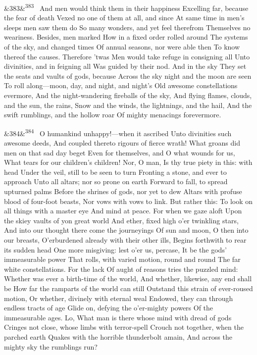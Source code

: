 \documentclass[12pt]{article}
\newcommand{\para}[1][]{\par\noindent\ifx&#1&\else\textsuperscript{\footnotesize #1}~\fi}
\begin{document}
\para[383] And men would think them in their happiness Excelling far, because the fear of death Vexed no one of them at all, and since At same time in men's sleeps men saw them do So many wonders, and yet feel therefrom Themselves no weariness. Besides, men marked How in a fixed order rolled around The systems of the sky, and changed times Of annual seasons, nor were able then To know thereof the causes. Therefore 'twas Men would take refuge in consigning all Unto divinities, and in feigning all Was guided by their nod. And in the sky They set the seats and vaults of gods, because Across the sky night and the moon are seen To roll along---moon, day, and night, and night's Old awesome constellations evermore, And the night-wandering fireballs of the sky, And flying flames, clouds, and the sun, the rains, Snow and the winds, the lightnings, and the hail, And the swift rumblings, and the hollow roar Of mighty menacings forevermore.

\para[384] O humankind unhappy!---when it ascribed Unto divinities such awesome deeds, And coupled thereto rigours of fierce wrath! What groans did men on that sad day beget Even for themselves, and O what wounds for us, What tears for our children's children! Nor, O man, Is thy true piety in this: with head Under the veil, still to be seen to turn Fronting a stone, and ever to approach Unto all altars; nor so prone on earth Forward to fall, to spread upturned palms Before the shrines of gods, nor yet to dew Altars with profuse blood of four-foot beasts, Nor vows with vows to link. But rather this: To look on all things with a master eye And mind at peace. For when we gaze aloft Upon the skiey vaults of yon great world And ether, fixed high o'er twinkling stars, And into our thought there come the journeyings Of sun and moon, O then into our breasts, O'erburdened already with their other ills, Begins forthwith to rear its sudden head One more misgiving: lest o'er us, percase, It be the gods' immeasurable power That rolls, with varied motion, round and round The far white constellations. For the lack Of aught of reasons tries the puzzled mind: Whether was ever a birth-time of the world, And whether, likewise, any end shall be How far the ramparts of the world can still Outstand this strain of ever-roused motion, Or whether, divinely with eternal weal Endowed, they can through endless tracts of age Glide on, defying the o'er-mighty powers Of the immeasurable ages. Lo, What man is there whose mind with dread of gods Cringes not close, whose limbs with terror-spell Crouch not together, when the parched earth Quakes with the horrible thunderbolt amain, And across the mighty sky the rumblings run?
\end{document}
